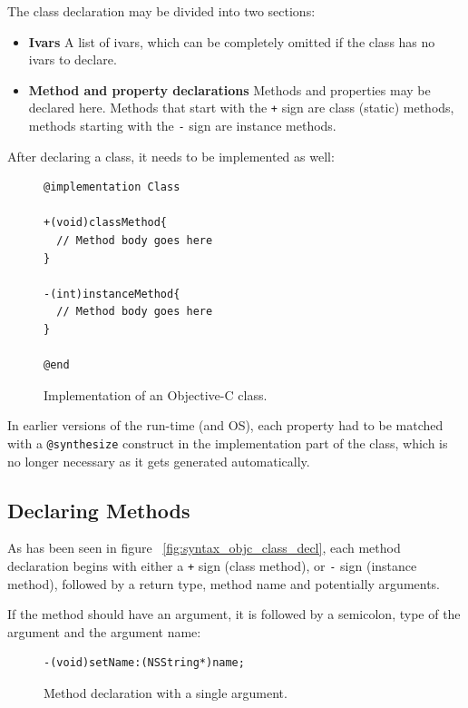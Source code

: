 The class declaration may be divided into two sections:

\begin{itemize}
  \item{\bf{Ivars}} A list of ivars, which can be completely omitted if the class has no ivars to declare.
  \item{\bf{Method and property declarations}} Methods and properties may be declared here. Methods that start with the \verb=+= sign are class (static) methods, methods starting with the \verb=-= sign are instance methods.
\end{itemize}

After declaring a class, it needs to be implemented as well:

\begin{figure}[H]
  \begin{verbatim}
@implementation Class

+(void)classMethod{
  // Method body goes here
}

-(int)instanceMethod{
  // Method body goes here
}

@end
  \end{verbatim}
  \centering{}
  \caption{Implementation of an Objective-C class.}
  \label{fig:syntax_objc_class_impl}
\end{figure}

In earlier versions of the run-time (and OS), each property had to be matched with a \verb=@synthesize= construct in the implementation part of the class, which is no longer necessary as it gets generated automatically.

\subsection{Declaring Methods}

As has been seen in figure ~\ref{fig:syntax_objc_class_decl}, each method declaration begins with either a \verb=+= sign (class method), or \verb=-= sign (instance method), followed by a return type, method name and potentially arguments.

If the method should have an argument, it is followed by a semicolon, type of the argument and the argument name:

\begin{figure}[H]
  \begin{verbatim}
-(void)setName:(NSString*)name;
  \end{verbatim}
  \centering{}
  \caption{Method declaration with a single argument.}
  \label{fig:syntax_objc_single_arg}
\end{figure}

